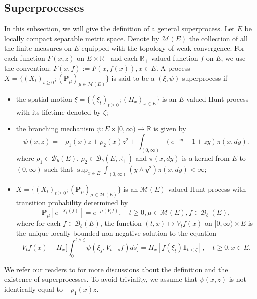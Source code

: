\documentclass[EJP]{ejpecp} %
\begin{document}
\subsection{Superprocesses}
\label{sec: definition of superprocess}
	In this subsection, we will give the definition of a general superprocess.
	Let $E$ be locally compact separable metric space. Denote by $\mathcal M(E)$ the collection of all the finite measures on $E$ equipped with the topology of weak convergence.
	For each function $F(x,z)$ on $E\times \mathbb R_+$ and each $\mathbb R_+$-valued function $f$ on $E$, we use the  convention: $ F(x,f) := F(x,f(x)), x\in E.$
	A process $X=\{(X_t)_{t\geq 0}; (\mathbf P_\mu)_{\mu \in \mathcal M(E)}\}$ is said to be a $(\xi,\psi)$-superprocess if
\begin{itemize}
\item
  	the spatial motion $\xi=\{(\xi_t)_{t\geq 0};(\Pi_x)_{x\in E}\}$ is an $E$-valued Hunt process with its lifetime denoted by $\zeta$;
\item
  	the branching mechanism $\psi: E\times[0,\infty) \to \mathbb R$ is given by
\begin{equation}
\label{eq: branching mechanism}
  	\psi(x,z)=
  	-\rho_1(x) z + \rho_2 (x) z^2 + \int_{(0,\infty)} (e^{-zy} - 1 + zy) \pi(x,dy).
\end{equation}
	where $\rho_1 \in \mathcal B_b(E)$, $\rho_2 \in \mathcal B_b(E, \mathbb R_+)$ and $\pi(x,dy)$ is a kernel from $E$ to $(0,\infty)$ such that $\sup_{x\in E} \int_{(0,\infty)} (y\wedge y^2) \pi(x,dy) < \infty$;
\item
  	$X=\{(X_t)_{t\geq 0}; (\mathbf P_\mu)_{\mu \in \mathcal M(E)}\}$ is an $\mathcal M(E)$-valued Hunt process with transition probability determined by
\[
    \mathbf P_\mu [e^{-X_t(f)}]
    = e^{-\mu(V_tf)},
    \quad t\geq 0, \mu \in \mathcal M(E), f\in \mathcal B^+_b(E),
\]
 	where for each $f\in \mathcal B_b(E)$, the function $(t,x)\mapsto V_tf(x)$ on $[0,\infty) \times E$ is the unique locally bounded non-negative solution to the equation
\begin{equation}
\label{eq:FKPP_in_definition}
    V_tf(x) + \Pi_x \Big[  \int_0^{t\wedge \zeta} \psi(\xi_s,V_{t-s}f)ds \Big]
    = \Pi_x [ f(\xi_t)\mathbf 1_{t<\zeta} ],
    \quad t \geq 0, x \in E.
\end{equation}
\end{itemize}
	We refer our readers to \cite{Li2011Measure-valued} for more discussions about the definition and the existence of superprocesses.
	To avoid triviality, we assume that $\psi(x,z)$ is not identically equal to $-\rho_1(x)z$.
\end{document}
